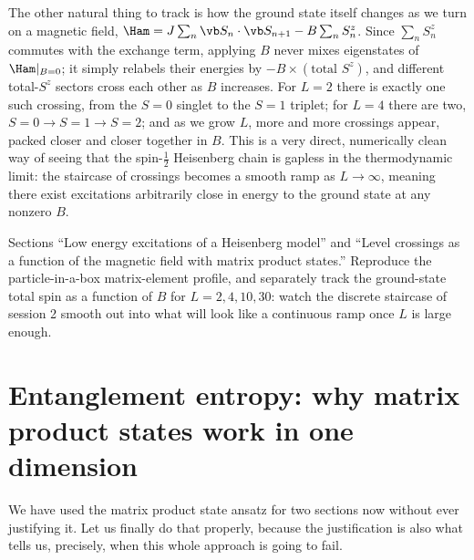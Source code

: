 \documentclass[all_sessions.tex]{subfiles}
\begin{document}
The other natural thing to track is how the ground state itself changes as we turn on a magnetic
field, $\Ham = J\sum_n \vb S_n\cdot\vb S_{n+1} - B\sum_n S_n^z$. Since $\sum_n S_n^z$ commutes with
the exchange term, applying $B$ never mixes eigenstates of $\Ham|_{B=0}$; it simply relabels their
energies by $-B\times(\text{total }S^z)$, and different total-$S^z$ sectors cross each other as $B$
increases. For $L=2$ there is exactly one such crossing, from the $S=0$ singlet to the $S=1$
triplet; for $L=4$ there are two, $S=0\to S=1\to S=2$; and as we grow $L$, more and more crossings
appear, packed closer and closer together in $B$. This is a very direct, numerically clean way of
seeing that the spin-$\tfrac12$ Heisenberg chain is gapless in the thermodynamic limit: the
staircase of crossings becomes a smooth ramp as $L\to\infty$, meaning there exist excitations
arbitrarily close in energy to the ground state at any nonzero $B$.

\begin{notebook}
Sections ``Low energy excitations of a Heisenberg model'' and ``Level crossings as a function of
the magnetic field with matrix product states.'' Reproduce the particle-in-a-box matrix-element
profile, and separately track the ground-state total spin as a function of $B$ for $L=2,4,10,30$:
watch the discrete staircase of session 2 smooth out into what will look like a continuous ramp
once $L$ is large enough.
\end{notebook}

\section{Entanglement entropy: why matrix product states work in one dimension}
\label{sec:entanglement}
We have used the matrix product state ansatz for two sections now without ever justifying it. Let
us finally do that properly, because the justification is also what tells us, precisely, when this
whole approach is going to fail.
\end{document}
